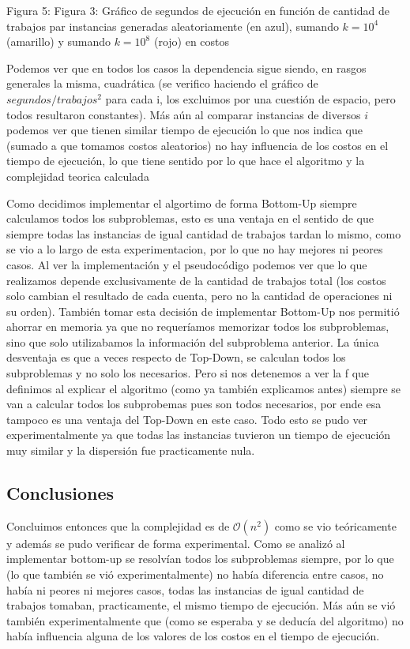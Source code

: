 \documentclass[A4paper,oneside,fleqn,11pt]{article}
\theoremstyle{definition}
\begin{document}
\scriptsize{Figura 5: Figura 3: Gráfico de segundos de ejecución en función de cantidad de trabajos par instancias generadas aleatoriamente (en azul), sumando $k=10^4$ (amarillo) y sumando $k=10^8$ (rojo) en costos}
\normalsize

Podemos ver que en todos los casos la dependencia sigue siendo, en rasgos generales la misma, cuadrática (se verifico haciendo el gráfico de $segundos / trabajos^2$ para cada i, los excluimos por una cuestión de espacio, pero todos resultaron constantes). Más aún al comparar instancias de diversos $i$ podemos ver que tienen similar tiempo de ejecución lo que nos indica que (sumado a que tomamos costos aleatorios) no hay influencia de los costos en el tiempo de ejecución, lo que tiene sentido por lo que hace el algoritmo y la complejidad teorica calculada


Como decidimos implementar el algortimo de forma Bottom-Up siempre calculamos todos los subproblemas, esto es una ventaja en el sentido de que siempre todas las instancias de igual cantidad de trabajos tardan lo mismo, como se vio a lo largo de esta experimentacion, por lo que no hay mejores ni peores casos. Al ver la implementación y el pseudocódigo podemos ver que lo que realizamos depende exclusivamente de la cantidad de trabajos total (los costos solo cambian el resultado de cada cuenta, pero no la cantidad de operaciones ni su orden). También tomar esta decisión de implementar Bottom-Up nos permitió ahorrar en memoria ya que no requeríamos memorizar todos los subproblemas, sino que solo utilizabamos la información del subproblema anterior. La única desventaja es que a veces respecto de Top-Down, se calculan todos los subproblemas y no solo los necesarios. Pero si nos detenemos a ver la f que definimos al explicar el algoritmo (como ya también explicamos antes) siempre se van a calcular todos los subprobemas pues son todos necesarios, por ende esa tampoco es una ventaja del Top-Down en este caso. Todo esto se pudo ver experimentalmente ya que todas las instancias tuvieron un tiempo de ejecución muy similar y la dispersión fue practicamente nula.

\subsection{Conclusiones}

Concluimos entonces que la complejidad es de $\mathcal{O}(n^2)$ como se vio teóricamente y además se pudo verificar de forma experimental. Como se analizó al implementar bottom-up se resolvían todos los subproblemas siempre, por lo que (lo que también se vió experimentalmente) no había diferencia entre casos, no había ni peores ni mejores casos, todas las instancias de igual cantidad de trabajos tomaban, practicamente, el mismo tiempo de ejecución. Más aún se vió también experimentalmente que (como se esperaba y se deducía del algoritmo) no había influencia alguna de los valores de los costos en el tiempo de ejecución.
\end{document}
